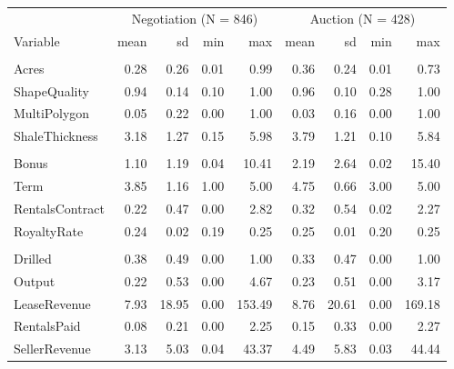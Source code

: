 
\begin{tabular}{lrrrrrrrr}
\toprule
\multicolumn{1}{c}{ } & \multicolumn{4}{c}{Negotiation (N = 846)} & \multicolumn{4}{c}{Auction (N = 428)} \\
\cmidrule(l{3pt}r{3pt}){2-5} \cmidrule(l{3pt}r{3pt}){6-9}
Variable & mean & sd & min & max & mean & sd & min & max\\
\midrule
\addlinespace[0.3em]
\multicolumn{9}{l}{\textbf{Land Characteristics}}\\
\hspace{1em}Acres & 0.28 & 0.26 & 0.01 & 0.99 & 0.36 & 0.24 & 0.01 & 0.73\\
\hspace{1em}ShapeQuality & 0.94 & 0.14 & 0.10 & 1.00 & 0.96 & 0.10 & 0.28 & 1.00\\
\hspace{1em}MultiPolygon & 0.05 & 0.22 & 0.00 & 1.00 & 0.03 & 0.16 & 0.00 & 1.00\\
\hspace{1em}ShaleThickness & 3.18 & 1.27 & 0.15 & 5.98 & 3.79 & 1.21 & 0.10 & 5.84\\
\addlinespace[0.3em]
\multicolumn{9}{l}{\textbf{Lease Characteristics}}\\
\hspace{1em}Bonus & 1.10 & 1.19 & 0.04 & 10.41 & 2.19 & 2.64 & 0.02 & 15.40\\
\hspace{1em}Term & 3.85 & 1.16 & 1.00 & 5.00 & 4.75 & 0.66 & 3.00 & 5.00\\
\hspace{1em}RentalsContract & 0.22 & 0.47 & 0.00 & 2.82 & 0.32 & 0.54 & 0.02 & 2.27\\
\hspace{1em}RoyaltyRate & 0.24 & 0.02 & 0.19 & 0.25 & 0.25 & 0.01 & 0.20 & 0.25\\
\addlinespace[0.3em]
\multicolumn{9}{l}{\textbf{Lease Outcomes}}\\
\hspace{1em}Drilled & 0.38 & 0.49 & 0.00 & 1.00 & 0.33 & 0.47 & 0.00 & 1.00\\
\hspace{1em}Output & 0.22 & 0.53 & 0.00 & 4.67 & 0.23 & 0.51 & 0.00 & 3.17\\
\hspace{1em}LeaseRevenue & 7.93 & 18.95 & 0.00 & 153.49 & 8.76 & 20.61 & 0.00 & 169.18\\
\hspace{1em}RentalsPaid & 0.08 & 0.21 & 0.00 & 2.25 & 0.15 & 0.33 & 0.00 & 2.27\\
\hspace{1em}SellerRevenue & 3.13 & 5.03 & 0.04 & 43.37 & 4.49 & 5.83 & 0.03 & 44.44\\
\bottomrule
\end{tabular}

